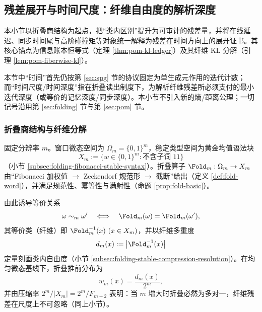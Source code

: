 \subsection{残差展开与时间尺度：纤维自由度的解析深度}\label{subsec:residual-unfolding-time-depth}

本小节以折叠商结构为起点，把“类内区别”提升为可审计的残差量，并将在线延迟、同步时间尾与高阶碰撞矩等对象统一解释为残差在时间方向上的展开证书。其核心锚点为信息账本恒等式（定理 \ref{thm:pom-kl-ledger}）及其纤维 KL 分解（引理 \ref{lem:pom-fiberwise-kl}）。\par
本节中“时间”首先仍按第 \ref{sec:spg} 节的协议固定为单生成元作用的迭代计数；而“时间尺度/时间深度”指在折叠读出制度下，为解析纤维残差所必须支付的最小迭代深度（或等价的记忆深度/同步深度）。本小节不引入新的熵/距离公理；一切记号沿用第 \ref{sec:folding} 节与第 \ref{sec:pom} 节。

\subsubsection{折叠商结构与纤维分解}\label{subsubsec:frt-quotient-fibers}
固定分辨率 \(m\)。窗口微态空间为 \(\Omega_m=\{0,1\}^m\)，稳定类型空间为黄金均值语法块
\[
X_m:=\{w\in\{0,1\}^m:\text{不含子词 }11\}
\]
（小节 \ref{subsec:folding-fibonacci-stable-syntax}）。折叠算子 \(\Fold_m:\Omega_m\to X_m\) 由“Fibonacci 加权值 \(\to\) Zeckendorf 规范形 \(\to\) 截断”给出（定义 \ref{def:fold-word}），并满足规范性、幂等性与满射性（命题 \ref{prop:fold-basic}）。\par
由此诱导等价关系
\[
\omega\sim_m\omega'\quad\Longleftrightarrow\quad \Fold_m(\omega)=\Fold_m(\omega'),
\]
其等价类（纤维）即 \(\Fold_m^{-1}(x)\ (x\in X_m)\)，并以纤维多重度
\[
d_m(x):=\bigl|\Fold_m^{-1}(x)\bigr|
\]
定量刻画类内自由度（小节 \ref{subsec:folding-stable-compression-resolution}）。在均匀微态基线下，折叠推前分布为
\[
w_m(x)=\frac{d_m(x)}{2^m},
\]
并由压缩率 \(2^m/|X_m|=2^m/F_{m+2}\) 表明：当 \(m\) 增大时折叠必然为多对一，纤维残差在尺度上不可忽略（同上小节）。

